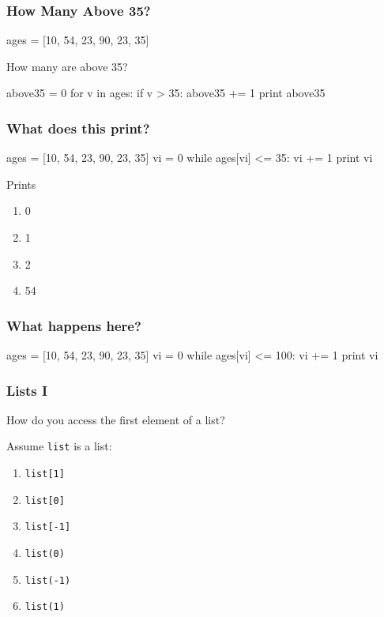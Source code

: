 \begin{frame}[fragile]
\frametitle{How Many Above 35?}

\begin{python}
ages = [10, 54, 23, 90, 23, 35]
\end{python}

How many are above 35?

\pause

\begin{python}
above35 = 0
for v in ages:
    if v > 35:
        above35 += 1
print above35
\end{python}

\end{frame}


\begin{frame}[fragile]
\frametitle{What does this print?}

\begin{python}
ages = [10, 54, 23, 90, 23, 35]
vi = 0
while ages[vi] <= 35:
    vi += 1
print vi
\end{python}

Prints

\begin{enumerate}
\item 0
\item 1
\item 2
\item 54
\end{enumerate}

\end{frame}


\begin{frame}[fragile]
\frametitle{What happens here?}

\begin{python}
ages = [10, 54, 23, 90, 23, 35]
vi = 0
while ages[vi] <= 100:
    vi += 1
print vi
\end{python}

\end{frame}


\begin{frame}
\frametitle{Lists I}

How do you access the first element of a list?

Assume \texttt{list} is a list:

\begin{enumerate}
\item \texttt{list[1]}
\item \texttt{list[0]}
\item \texttt{list[-1]}
\item \texttt{list(0)}
\item \texttt{list(-1)}
\item \texttt{list(1)}
\end{enumerate}
\end{frame}

